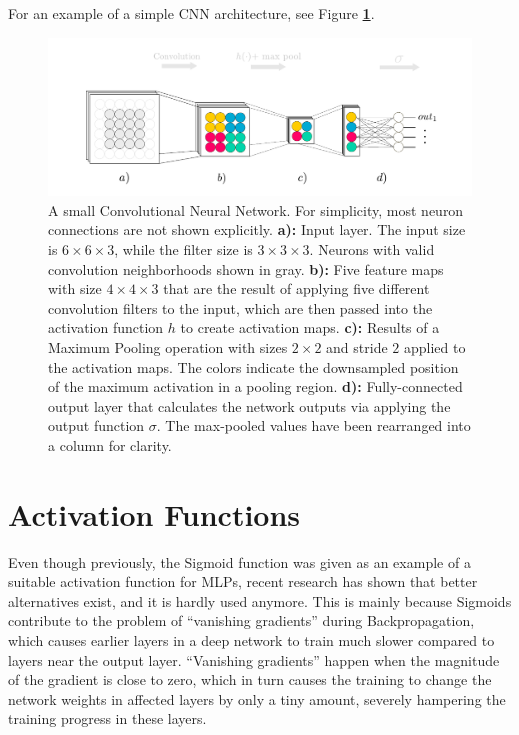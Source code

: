 For an example of a simple CNN architecture, see Figure \textbf{\ref{fig:convnet}}.

\begin {figure}[!htb]
	\begin{flushleft}
		\includegraphics[scale=0.65]{img/fig_convnet}
	\end{flushleft}
	\caption[A small Convolutional Neural Network.]{A small Convolutional Neural Network. For simplicity, most neuron connections are not shown explicitly. \textbf{a):} Input layer. The input size is $6 \times 6 \times 3$, while the filter size is $3 \times 3 \times 3$. Neurons with valid convolution neighborhoods shown in gray. \textbf{b):} Five feature maps with size $4 \times 4 \times 3$ that are the result of applying five different convolution filters to the input, which are then passed into the activation function $h$ to create activation maps. \textbf{c):} Results of a Maximum Pooling operation with sizes $2 \times 2$ and stride $2$ applied to the activation maps. The colors indicate the downsampled position of the maximum activation in a pooling region. \textbf{d):} Fully-connected output layer that calculates the network outputs via applying the output function $\sigma$. The max-pooled values have been rearranged into a column for clarity.}
	\label{fig:convnet}
\end {figure}


	\section {Activation Functions}
Even though previously, the Sigmoid function was given as an example of a suitable activation function for MLPs, recent research \cite{glorot, rectifiers} has shown that better alternatives exist, and it is hardly used anymore. This is mainly because Sigmoids contribute to the problem of ``vanishing gradients'' during Backpropagation, which causes earlier layers in a deep network to train much slower compared to layers near the output layer. ``Vanishing gradients'' happen when the magnitude of the gradient is close to zero, which in turn causes the training to change the network weights in affected layers by only a tiny amount, severely hampering the training progress in these layers.

